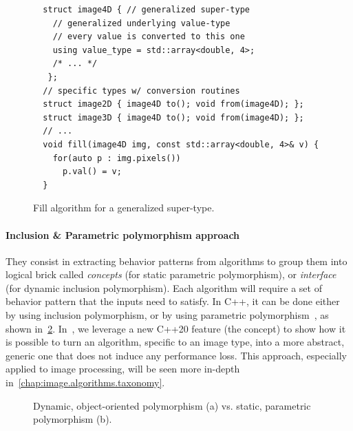 \begin{figure}[htbp]
  \centering
  \begin{verbatim}
  struct image4D { // generalized super-type
    // generalized underlying value-type
    // every value is converted to this one
    using value_type = std::array<double, 4>;
    /* ... */
   };
  // specific types w/ conversion routines
  struct image2D { image4D to(); void from(image4D); };
  struct image3D { image4D to(); void from(image4D); };
  // ...
  void fill(image4D img, const std::array<double, 4>& v) {
    for(auto p : img.pixels())
      p.val() = v;
  }
  \end{verbatim}
  \caption{Fill algorithm for a generalized super-type.}
  \label{code:gen.generalized}
\end{figure}

\paragraph{Inclusion \& Parametric polymorphism approach} They consist in extracting behavior patterns from algorithms
to group them into logical brick called \emph{concepts} (for static parametric polymorphism), or \emph{interface} (for
dynamic inclusion polymorphism). Each algorithm will require a set of behavior pattern that the inputs need to satisfy.
In C++, it can be done either by using inclusion polymorphism, or by using parametric
polymorphism~\parencite{gibbons.2007.datatype}, as shown in~\cref{code:gen.inclupoly}. In~\parencite{roynard.2019.rrpr},
we leverage a new C++20 feature (the concept) to show how it is possible to turn an algorithm, specific to an image
type, into a more abstract, generic one that does not induce any performance loss. This approach, especially applied to
image processing, will be seen more in-depth in~\cref{chap:image.algorithms.taxonomy}.

\begin{figure}[htb]
  \centering
  \hfil
  \vfil
  \hfil
  \caption{Dynamic, object-oriented polymorphism (a) vs. static, parametric polymorphism (b).}
  \label{code:gen.inclupoly}
\end{figure}

